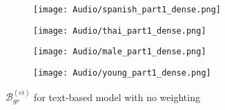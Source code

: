 \begin{figure}[H]
    \centering
    \begin{minipage}{0.23\textwidth}
        \begin{figure}[H]
            \centering
            \texttt{[image: Audio/spanish\_part1\_dense.png]}
        \end{figure}
    \end{minipage}
    \begin{minipage}{0.23\textwidth}
        \begin{figure}[H]
            \centering
            \texttt{[image: Audio/thai\_part1\_dense.png]}
        \end{figure}
    \end{minipage}
    \begin{minipage}{0.23\textwidth}
        \begin{figure}[H]
            \centering
            \texttt{[image: Audio/male\_part1\_dense.png]}
        \end{figure}
    \end{minipage}
    \begin{minipage}{0.23\textwidth}
        \begin{figure}[H]
            \centering
            \texttt{[image: Audio/young\_part1\_dense.png]}
        \end{figure}
    \end{minipage}
    \caption{$\mathcal{B}_{gr}^{(ci)}$ for text-based model with no weighting}
    \label{fig:grad_audio}
\end{figure}

